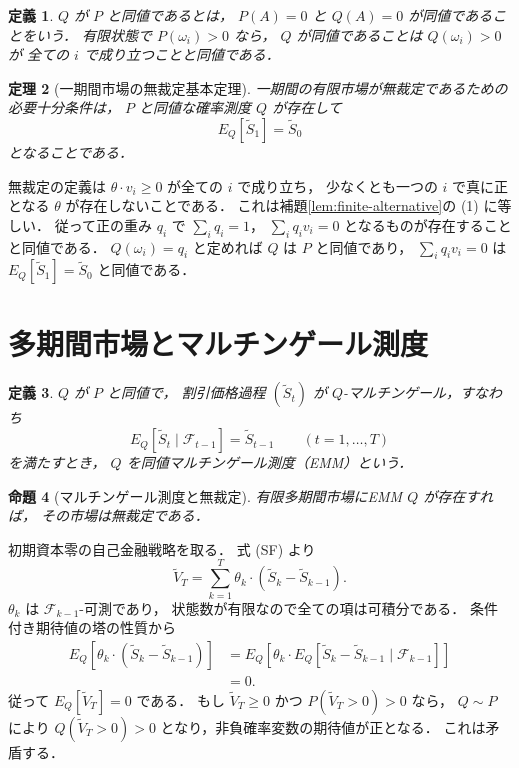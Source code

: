 \documentclass[a5paper,10pt,onecolumn]{jsarticle}
\makeatletter
\theoremstyle{mathnotetheorem}
\newtheorem{theorem}{定理}[section]
\newtheorem{definition}[theorem]{定義}
\newtheorem{proposition}[theorem]{命題}
\renewcommand{\proofname}{証明}
\renewenvironment{proof}[1][\proofname]{%
  \par\pushQED{\qed}\normalfont\topsep4\p@\@plus2\p@\relax
  \trivlist\item[\hskip\labelsep\bfseries #1]\ignorespaces
}{\popQED\endtrivlist\@endpefalse}
\makeatother
\begin{document}
\begin{definition}
$Q$ が $P$ と\emph{同値}であるとは，
$P(A)=0$ と $Q(A)=0$ が同値であることをいう．
有限状態で $P(\omega_i)>0$ なら，
$Q$ が同値であることは $Q(\omega_i)>0$ が
全ての $i$ で成り立つことと同値である．
\end{definition}

\begin{theorem}[一期間市場の無裁定基本定理]
\label{thm:one-period-ftap}
一期間の有限市場が無裁定であるための必要十分条件は，
$P$ と同値な確率測度 $Q$ が存在して
\[
 E_Q[\widetilde S_1]=\widetilde S_0
\]
となることである．
\end{theorem}
\begin{proof}
無裁定の定義は
$\theta\cdot v_i\ge0$ が全ての $i$ で成り立ち，
少なくとも一つの $i$ で真に正となる
$\theta$ が存在しないことである．
これは補題\ref{lem:finite-alternative}の (1) に等しい．
従って正の重み $q_i$ で
$\sum_iq_i=1$，
$\sum_iq_iv_i=0$ となるものが存在することと同値である．
$Q(\omega_i)=q_i$ と定めれば $Q$ は $P$ と同値であり，
$\sum_iq_iv_i=0$ は
$E_Q[\widetilde S_1]=\widetilde S_0$ と同値である．
\end{proof}

\section{多期間市場とマルチンゲール測度}

\begin{definition}
$Q$ が $P$ と同値で，
割引価格過程 $(\widetilde S_t)$ が
$Q$-マルチンゲール，すなわち
\[
 E_Q[\widetilde S_t\mid\mathcal F_{t-1}]
 =\widetilde S_{t-1}\qquad(t=1,\dots,T)
\]
を満たすとき，
$Q$ を\emph{同値マルチンゲール測度}（EMM）という．
\end{definition}

\begin{proposition}[マルチンゲール測度と無裁定]
\label{prop:emm-no-arb}
有限多期間市場にEMM $Q$ が存在すれば，
その市場は無裁定である．
\end{proposition}
\begin{proof}
初期資本零の自己金融戦略を取る．
式 (SF) より
\[
 \widetilde V_T
 =\sum_{k=1}^T\theta_k\cdot
  (\widetilde S_k-\widetilde S_{k-1}).
\]
$\theta_k$ は $\mathcal F_{k-1}$-可測であり，
状態数が有限なので全ての項は可積分である．
条件付き期待値の塔の性質から
\begin{align*}
 E_Q[\theta_k\cdot(\widetilde S_k-\widetilde S_{k-1})]
 &=E_Q[\theta_k\cdot
   E_Q[\widetilde S_k-\widetilde S_{k-1}
       \mid\mathcal F_{k-1}]]\\
 &=0.
\end{align*}
従って $E_Q[\widetilde V_T]=0$ である．
もし $\widetilde V_T\ge0$ かつ
$P(\widetilde V_T>0)>0$ なら，
$Q\sim P$ により $Q(\widetilde V_T>0)>0$
となり，非負確率変数の期待値が正となる．
これは矛盾する．
\end{proof}
\end{document}
